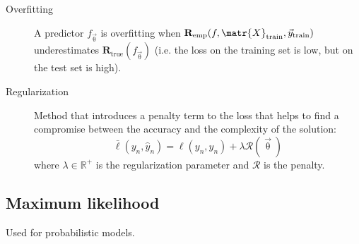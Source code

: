 \begin{description}
\begin{description}
            \item[Overfitting] 
                A predictor $f_\vec{\uptheta}$ is overfitting when $\textbf{R}_\text{emp}(f, \matr{X}_\text{train}, \vec{y}_\text{train})$
                underestimates $\textbf{R}_\text{true}(f_\vec{\uptheta})$ (i.e. the loss on the training set is low, but on the test set is high).

            \item[Regularization] 
                Method that introduces a penalty term to the loss that
                helps to find a compromise between the accuracy and the complexity of the solution:
                \[ \bar{\ell}(y_n, \hat{y}_n) = \ell(y_n, \hat{y}_n) + \lambda \mathcal{R}(\vec{\uptheta}) \]
                where $\lambda \in \mathbb{R}^+$ is the regularization parameter and $\mathcal{R}$ is the penalty.
        \end{description}
\end{description}



\subsection{Maximum likelihood}
Used for probabilistic models.